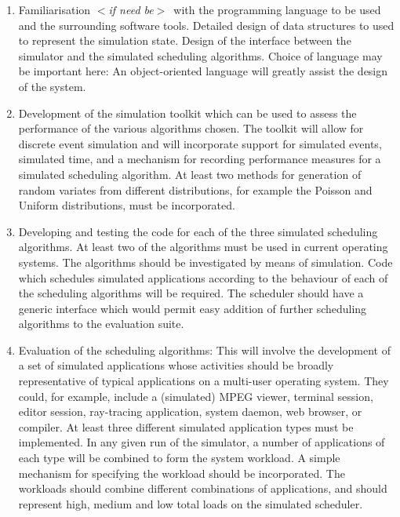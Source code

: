 \documentclass[12pt]{article}
\newcommand{\al}{$<$}
\newcommand{\ar}{$>$}
\begin{document}
\begin{enumerate}

\item Familiarisation \al\emph{if need be}\ar\ with the programming
  language to be used and the surrounding software tools.  Detailed
  design of data structures to used to represent the simulation state.
  Design of the interface between the simulator and the simulated
  scheduling algorithms. Choice of language may be important here: An
  object-oriented language will greatly assist the design of the
  system.

\item Development of the simulation toolkit which can be used to
  assess the performance of the various algorithms chosen.  The
  toolkit will allow for discrete event simulation and will
  incorporate support for simulated events, simulated time, and a
  mechanism for recording performance measures for a simulated
  scheduling algorithm.  At least two methods for generation of random
  variates from different distributions, for example the Poisson and
  Uniform distributions, must be incorporated.

\item Developing and testing the code for each of the three
  simulated scheduling algorithms.  At least two of the algorithms
  must be used in current operating systems.  The algorithms should be
  investigated by means of simulation. Code which schedules simulated
  applications according to the behaviour of each of the scheduling
  algorithms will be required.  The scheduler should have a generic
  interface which would permit easy addition of further scheduling
  algorithms to the evaluation suite.

\item Evaluation of the scheduling algorithms: This will involve
  the development of a set of simulated applications whose activities
  should be broadly representative of typical applications on a
  multi-user operating system. They could, for example, include a
  (simulated) MPEG viewer, terminal session, editor session,
  ray-tracing application, system daemon, web browser, or compiler.
  At least three different simulated application types must be
  implemented.  In any given run of the simulator, a number of
  applications of each type will be combined to form the system
  workload.  A simple mechanism for specifying the workload should be
  incorporated.  The workloads should combine different combinations
  of applications, and should represent high, medium and low total
  loads on the simulated scheduler.


\end{enumerate}
\end{document}
